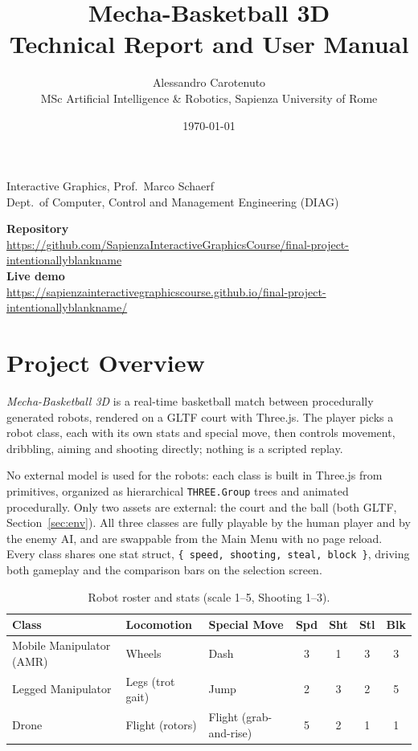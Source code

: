\documentclass[11pt,a4paper]{article}
\title{\textbf{Mecha-Basketball 3D}\\[0.3em]\large Technical Report and User Manual}
\author{Alessandro Carotenuto\\
\small MSc Artificial Intelligence \& Robotics, Sapienza University of Rome}
\date{\today}
\newcommand{\code}[1]{\texttt{#1}}
\begin{document}
\maketitle
\thispagestyle{empty}

\begin{center}
Interactive Graphics, Prof.\ Marco Schaerf\\
Dept.\ of Computer, Control and Management Engineering (DIAG)

\vspace{0.8em}
\textbf{Repository}\\
\small\url{https://github.com/SapienzaInteractiveGraphicsCourse/final-project-intentionallyblankname}\\[0.4em]
\normalsize\textbf{Live demo}\\
\small\url{https://sapienzainteractivegraphicscourse.github.io/final-project-intentionallyblankname/}
\end{center}

\vspace{0.5em}
\setcounter{tocdepth}{1}
{\small\tableofcontents}
\vspace{0.5em}

\section{Project Overview}

\textit{Mecha-Basketball 3D} is a real-time basketball match between procedurally generated robots, rendered on a GLTF court with Three.js. The player picks a robot class, each with its own stats and special move, then controls movement, dribbling, aiming and shooting directly; nothing is a scripted replay.

No external model is used for the robots: each class is built in Three.js from primitives, organized as hierarchical \code{THREE.Group} trees and animated procedurally. Only two assets are external: the court and the ball (both GLTF, Section~\ref{sec:env}). All three classes are fully playable by the human player and by the enemy AI, and are swappable from the Main Menu with no page reload. Every class shares one stat struct, \verb|{ speed, shooting, steal, block }|, driving both gameplay and the comparison bars on the selection screen.

\begin{table}[htbp]
\centering
\small
\begin{tabular}{l l l c c c c}
\toprule
\textbf{Class} & \textbf{Locomotion} & \textbf{Special Move} & \textbf{Spd} & \textbf{Sht} & \textbf{Stl} & \textbf{Blk} \\
\midrule
Mobile Manipulator (AMR) & Wheels & Dash & 3 & 1 & 3 & 3 \\
Legged Manipulator & Legs (trot gait) & Jump & 2 & 3 & 2 & 5 \\
Drone & Flight (rotors) & Flight (grab-and-rise) & 5 & 2 & 1 & 1 \\
\bottomrule
\end{tabular}
\caption{Robot roster and stats (scale 1--5, Shooting 1--3).}
\end{table}
\end{document}
